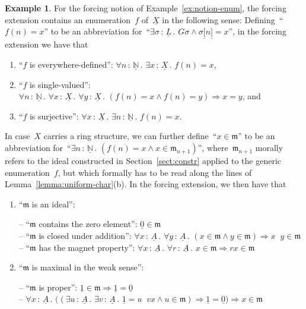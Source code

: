 \documentclass[com,11pt,crcready]{iosart2x}
\theoremstyle{definition}
\newtheorem{example}[definition]{Example}
\theoremstyle{plain}
\theoremstyle{remark}
\newcommand{\?}{\,{:}\,}
\newcommand{\mmm}{\mathfrak{m}}
\newcommand{\NN}{\mathbb{N}}
\renewcommand{\_}{\mathpunct{.}\,}
\begin{document}
\begin{example}\label{ex:gen-enum-max}For the forcing notion of Example~\ref{ex:notion-enum}, the
forcing extension contains an enumeration~$f$ of~$\underline{X}$ in the following
sense: Defining~``$f(n) = x$'' to be an abbreviation for~``$\exists
\sigma\?\underline{L}\_ G\sigma \wedge \sigma\underline{[}n\underline{]} =
x$'', in the forcing extension we have that
\begin{enumerate}
\item ``$f$ is everywhere-defined'': $\forall n\?\underline{\NN}\_ \exists
x\?\underline{X}\_ f(n) = x$,
\item ``$f$ is single-valued'': $\forall n\?\underline{\NN}\_ \forall
x\?\underline{X}\_ \forall y\?\underline{X}\_
(f(n) = x \wedge f(n) = y) \Rightarrow x = y$, and
\item ``$f$ is surjective'': $\forall x\?\underline{X}\_ \exists n\?\underline{\NN}\_
f(n) = x$.
\end{enumerate}
In case~$X$ carries a ring structure, we can further define~``$x \in \mmm$''
to be an abbreviation for~``$\exists n\?\underline{\NN}\_ (f(n) = x \wedge x \in
\mmm_{n+1})$'', where~$\mmm_{n+1}$ morally refers to the ideal constructed in
Section~\ref{sect:constr} applied to the generic enumeration~$f$, but which
formally has to be read along the lines of Lemma~\ref{lemma:uniform-char}(b).
In the forcing extension, we then have that
\begin{enumerate}
\addtocounter{enumi}{3}
\item ``$\mmm$ is an ideal'':

-- ``$\mmm$ contains the zero element'': $\underline{0} \in \mmm$ \\
-- ``$\mmm$ is closed under addition'': $\forall x\?\underline{A}\_ \forall y\?\underline{A}\_ (x \in \mmm \wedge y \in
\mmm) \Rightarrow x\mathop{\underline{+}}y \in \mmm$ \\
-- ``$\mmm$ has the magnet property'': $\forall x\?\underline{A}\_ \forall
r\?\underline{A}\_ x \in \mmm \Rightarrow rx \in \mmm$

\item ``$\mmm$ is maximal in the weak sense'':

-- ``$\mmm$ is proper'': $\underline{1} \in \mmm \Rightarrow \underline{1} =
\underline{0}$ \\
-- $\forall x\?\underline{A}\_ \bigl((\exists u\?\underline{A}\_
\exists v\?\underline{A}\_ \underline{1} = u \mathop{\underline{+}} vx \wedge u
\in \mmm) \Rightarrow \underline{1} =
\underline{0}\bigr) \Rightarrow x \in \mmm$
\end{enumerate}
\end{example}
\end{document}
